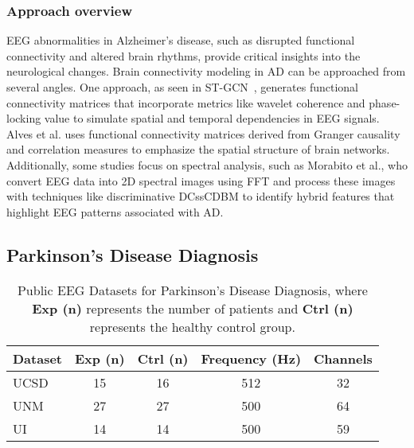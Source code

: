 \subsubsection{Approach overview}
EEG abnormalities in Alzheimer’s disease, such as disrupted functional connectivity and altered brain rhythms, provide critical insights into the neurological changes. Brain connectivity modeling in AD can be approached from several angles. 
One approach, as seen in ST-GCN~\cite{shan2022spatial}, generates functional connectivity matrices that incorporate metrics like wavelet coherence and phase-locking value to simulate spatial and temporal dependencies in EEG signals. 
Alves et al.\cite{AD1} uses functional connectivity matrices derived from Granger causality and correlation measures to emphasize the spatial structure of brain networks. 
Additionally, some studies focus on spectral analysis, such as Morabito et al.\cite{AD5}, who convert EEG data into 2D spectral images using FFT and process these images with techniques like discriminative DCssCDBM to identify hybrid features that highlight EEG patterns associated with AD.


\subsection{Parkinson's Disease Diagnosis}

\begin{table}[t]
\renewcommand{\arraystretch}{1.2}
\caption{Public EEG Datasets for Parkinson's Disease Diagnosis, where \textbf{Exp (n)} represents the number of patients and \textbf{Ctrl (n)} represents the healthy control group.}
\label{tab:pd}
\footnotesize
\centering
\begin{tabular}{lcccc}
\hline
\textbf{Dataset}            & \textbf{Exp (n)}   & \textbf{Ctrl (n)}   & \textbf{Frequency (Hz)} & \textbf{Channels} \\
\hline
UCSD~\cite{ds002778:1.0.5}  & 15                & 16                & 512              & 32                \\
UNM~\cite{cavanagh2018diminished} & 27                & 27                & 500              & 64                \\
UI~\cite{singh2020frontal}   & 14                & 14                & 500              & 59                \\
\hline
\end{tabular}
\end{table}

